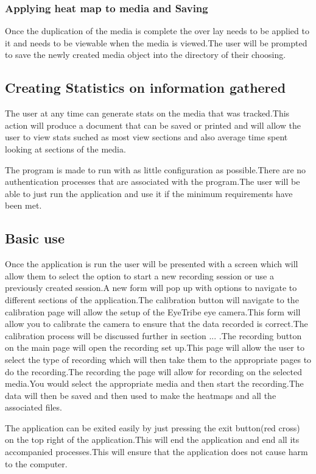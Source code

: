 \subsubsection{Applying heat map to media and Saving}
Once the duplication of the media is complete the over lay needs to be applied to it and needs to be viewable when the media is viewed.The user will be prompted to save the newly created media object into the directory of their choosing.
\subsection{Creating Statistics on information gathered}
The user at any time can generate stats on the  media that was tracked.This action will produce a document that can be saved or printed and will allow the user to view stats suched as most view sections and also average time spent looking at sections of the media.

The program is made to run with as little configuration as possible.There are no authentication processes that are associated with the program.The user will be able to just run the application and use it if the minimum requirements have been met.

\subsection{Basic use}
Once the application is run the user will be presented with a screen which will allow them to select the option to start a new recording session or use a previously created session.A new form will pop up with options to navigate to different sections of the application.The calibration button will navigate to the calibration page will allow the setup of the EyeTribe eye camera.This form will allow you to calibrate the camera to ensure that the data recorded is correct.The calibration process will be discussed further in section ... .The recording button on the main page will open the recording set up.This page will allow the user to select the type of recording which will then take them to the appropriate pages to do the recording.The recording the page will allow for recording on the selected media.You would select the appropriate media and then start the recording.The data will then be saved and then used to make the heatmaps and all the associated files.\newline

The application can be exited easily by just pressing the exit button(red cross) on the top right of the application.This will end the application and end all its accompanied processes.This will ensure that the application does not cause harm to the computer.
\fi

